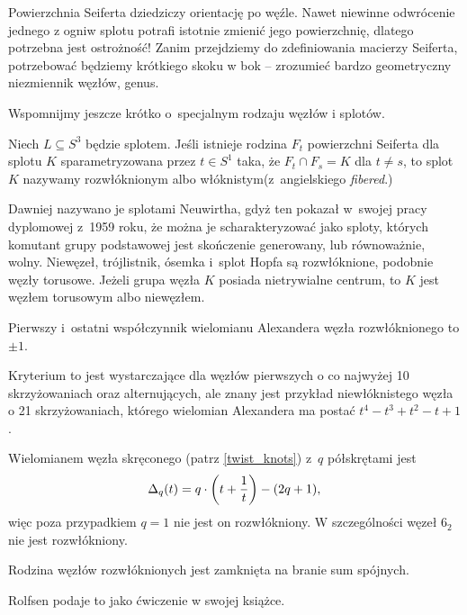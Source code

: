 Powierzchnia Seiferta dziedziczy orientację po węźle.
Nawet niewinne odwrócenie jednego z ogniw splotu potrafi istotnie zmienić jego powierzchnię, dlatego potrzebna jest ostrożność!
Zanim przejdziemy do zdefiniowania macierzy Seiferta, potrzebować będziemy krótkiego skoku w bok -- zrozumieć bardzo geometryczny niezmiennik węzłów, genus.

Wspomnijmy jeszcze krótko o~specjalnym rodzaju węzłów i splotów.

\begin{definition}
    Niech $L \subseteq S^3$ będzie splotem.
    Jeśli istnieje rodzina $F_t$ powierzchni Seiferta dla splotu $K$ sparametryzowana przez $t \in S^1$ taka, że $F_t \cap F_s = K$ dla $t \neq s$, to splot $K$ nazywamy rozwłóknionym albo włóknistym(z~angielskiego \emph{fibered}.)
\end{definition}

Dawniej nazywano je splotami Neuwirtha, gdyż ten pokazał w~swojej pracy dyplomowej z~1959 roku, że można je scharakteryzować jako sploty, których komutant grupy podstawowej jest skończenie generowany, lub równoważnie, wolny.
Niewęzeł, trójlistnik, ósemka i~splot Hopfa są rozwłóknione, podobnie węzły torusowe.
Jeżeli grupa węzła $K$ posiada nietrywialne centrum, to $K$ jest węzłem torusowym albo niewęzłem.

\begin{proposition}
    Pierwszy i~ostatni współczynnik wielomianu Alexandera węzła rozwłóknionego to $\pm 1$.
\end{proposition}

Kryterium to jest wystarczające dla węzłów pierwszych o co najwyżej 10 skrzyżowaniach oraz alternujących, ale znany jest przykład niewłóknistego węzła o 21 skrzyżowaniach, którego wielomian Alexandera ma postać $t^4 - t^3 + t^2 - t +1$.

Wielomianem węzła skręconego (patrz \ref{twist_knots}) z~$q$ półskrętami jest
\begin{equation}
    \Delta_q(t) = q \cdot \left(t + \frac 1 t\right)  - (2q+1),
\end{equation}
więc poza przypadkiem $q = 1$ nie jest on rozwłókniony.
W szczególności węzeł $6_2$ nie jest rozwłókniony.

\begin{proposition}
    Rodzina węzłów rozwłóknionych jest zamknięta na branie sum spójnych.
\end{proposition}

Rolfsen podaje to jako ćwiczenie w swojej książce.

